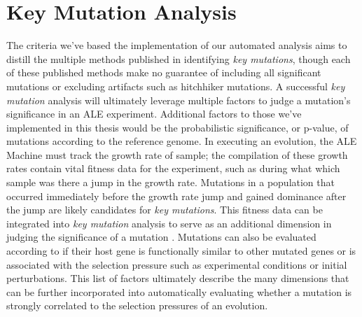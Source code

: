 \documentclass[12pt,final,masters,chapterheads]{ucsd}  %
\begin{document}
\section{Key Mutation Analysis}

%
%
%
%
The criteria we've based the implementation of our automated analysis aims to distill the multiple methods published in identifying \textit{key mutations}, though each of these published methods make no guarantee of including all significant mutations or excluding artifacts such as hitchhiker mutations. A successful \textit{key mutation} analysis will ultimately leverage multiple factors to judge a mutation's significance in an ALE experiment. Additional factors to those we've implemented in this thesis would be the probabilistic significance, or p-value, of mutations according to the reference genome. In executing an evolution, the ALE Machine must track the growth rate of sample; the compilation of these growth rates contain vital fitness data for the experiment, such as during what which sample was there a jump in the growth rate. Mutations in a population that occurred immediately before the growth rate jump and gained dominance after the jump are likely candidates for \textit{key mutations}. This fitness data can be integrated into \textit{key mutation} analysis to serve as an additional dimension in judging the significance of a mutation \cite{pmid25304508}. Mutations can also be evaluated according to if their host gene is functionally similar to other mutated genes or is associated with the selection pressure such as experimental conditions or initial perturbations. This list of factors ultimately describe the many dimensions that can be further incorporated into automatically evaluating whether a mutation is strongly correlated to the selection pressures of an evolution.
\end{document}
